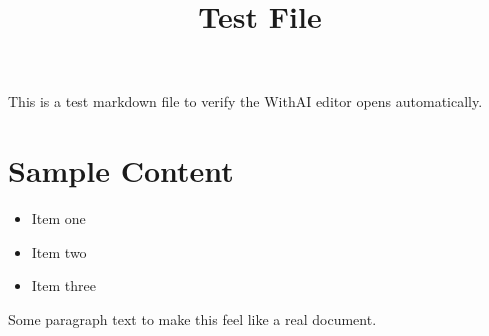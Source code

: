 \documentclass{article}
\title{Test File}
\author{}
\date{}
\begin{document}
\maketitle

This is a test markdown file to verify the WithAI editor opens automatically.

\section*{Sample Content}

\begin{itemize}
    \item Item one
    \item Item two
    \item Item three
\end{itemize}

Some paragraph text to make this feel like a real document.
\end{document}
